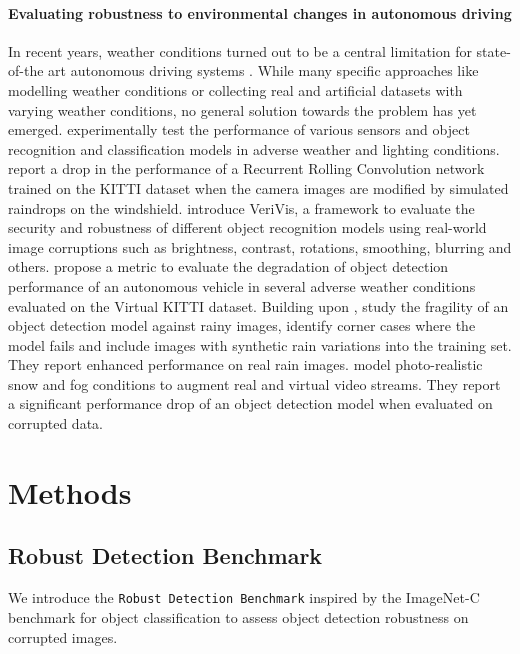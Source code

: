 \documentclass{article}
\begin{document}
\paragraph{Evaluating robustness to environmental changes in autonomous driving}
In recent years, weather conditions turned out to be a central limitation for state-of-the art autonomous driving systems \citep{Sakaridis18foggycityscapes, volk2019, dai2018dark, chen2018domain, lee2018selfdrivingadverseweather}. While many specific approaches like modelling weather conditions \citep{Sakaridis18foggycityscapes, Sakaridis18foggyadaption, volk2019, bernuth2019, hospach2016, Bernuth2018RenderingPC} or collecting real \citep{Wen15detrac, yu2018bdd100k, che2019d2city, nuscenes2019} and artificial \citep{gaidon2016virtualkitti, Ros2016synthia, Richter2017vipergtav, Johnson-Roberson2017matrix} datasets with varying weather conditions, no general solution towards the problem has yet emerged.
\citet{DBLP:journals/corr/RadeckiCM16} experimentally test the performance of various sensors and object recognition and classification  models in adverse weather and lighting conditions.
\citet{Bernuth2018RenderingPC} report a drop in the performance of a Recurrent Rolling Convolution network trained on the KITTI dataset when the camera images are modified by simulated raindrops on the windshield.
\citet{pei2017towards} introduce VeriVis, a framework to evaluate the security and robustness of different object recognition models using real-world image corruptions such as brightness, contrast, rotations, smoothing, blurring and others. \citet{harshitha2018} propose a metric to evaluate the degradation of object detection performance of an autonomous vehicle in several adverse weather conditions evaluated on the Virtual KITTI dataset. 
Building upon \cite{hospach2016}, \citet{volk2019} study the fragility of an object detection model against rainy images, identify corner cases where the model fails and include images with synthetic rain variations into the training set. They report enhanced performance on real rain images.
\citet{bernuth2019} model photo-realistic snow and fog conditions to augment real and virtual video streams. They report a significant performance drop of an object detection model when evaluated on corrupted data. \section{Methods}
  \label{methods}
\subsection{Robust Detection Benchmark}
\label{meth:benchmark}
We introduce the \texttt{Robust Detection Benchmark} inspired by the ImageNet-C benchmark for object classification \citep{hendrycks2018benchmarking} to assess object detection robustness on corrupted images. 
\end{document}
